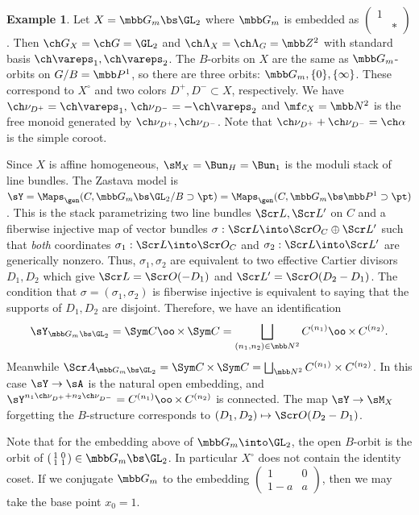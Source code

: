 \documentclass[final]{amsart}
\theoremstyle{remark}
\theoremstyle{definition}
\newtheorem{eg}[subsubsection]{Example}
\DeclareMathOperator*{\xt}{\times}
\numberwithin{equation}{section}
\begin{document}
\begin{eg} \label{eg:YHecke}
Let $X = \mbb G_m \bs \GL_2$ where $\mbb G_m$ is embedded as $\left( \begin{smallmatrix} 1 & \\ & * \end{smallmatrix} \right)$. 
Then $\ch G_X = \ch G = \GL_2$ and $\ch\Lambda_X = \ch\Lambda_G = \mbb Z^2$ with 
standard basis $\ch\vareps_1,\ch\vareps_2$.
The $B$-orbits on $X$ are the same as $\mbb G_m$-orbits on $G/B=\mbb P^1$, so
there are three orbits: $\mbb G_m, \{0\}, \{\infty\}$. 
These correspond to $X^\circ$ and two colors $D^+, D^- \subset X$, respectively.
We have $\ch\nu_{D^+} = \ch\vareps_1,\, \ch\nu_{D^-} = -\ch\vareps_2$
and $\mf c_X = \mbb N^2$ is the free monoid generated by $\ch\nu_{D^+}, \ch\nu_{D^-}$. 
Note that $\ch\nu_{D^+} + \ch\nu_{D^-} = \ch\alpha$ is the simple coroot. 

Since $X$ is affine homogeneous, $\sM_X = \Bun_H = \Bun_1$ is the moduli stack
of line bundles. The Zastava model is $\sY=\Maps_\gen(C, \mbb G_m \bs \GL_2/B \supset \pt) 
= \Maps_\gen(C, \mbb G_m \bs \mbb P^1 \supset \pt)$. 
This is the stack parametrizing two line bundles $\Scr L, \Scr L'$ on $C$
and a fiberwise injective map of vector bundles $\sigma :\Scr L \into \Scr O_C \oplus \Scr L'$ 
such that \emph{both} coordinates $\sigma_1 : \Scr L \into \Scr O_C$ and $\sigma_2 : \Scr L \into \Scr L'$ are generically nonzero. 
Thus, $\sigma_1,\sigma_2$ are equivalent to two effective Cartier divisors 
$D_1, D_2$ which give $\Scr L = \Scr O(-D_1)$ and $\Scr L' = \Scr O(D_2-D_1)$. 
The condition that $\sigma=(\sigma_1,\sigma_2)$ is fiberwise injective is equivalent
to saying that the supports of $D_1,D_2$ are disjoint. 
Therefore, we have an identification
\[ \sY_{\mbb G_m \bs \GL_2} = \Sym C \oo\xt \Sym C = \bigsqcup_{(n_1,n_2)\in \mbb N^2} C^{(n_1)} \oo\xt C^{(n_2)}. \]
Meanwhile $\Scr A_{\mbb G_m \bs \GL_2} = \Sym C \xt \Sym C = \bigsqcup_{\mbb N^2} C^{(n_1)} \times C^{(n_2)}$. 
In this case $\sY \to \sA$ is the natural open embedding, and 
$\sY^{n_1\ch\nu_{D^+}+n_2\ch\nu_{D^-}} = C^{(n_1)} \oo\xt C^{(n_2)}$ is connected.
The map $\sY \to \sM_X$ forgetting the $B$-structure corresponds to 
$(D_1,D_2) \mapsto \Scr O(D_2-D_1)$. 

Note that for the embedding above of $\mbb G_m \into \GL_2$, 
the open $B$-orbit is the orbit of $\left( \begin{smallmatrix} 1 & 0 \\ 1 & 1 \end{smallmatrix}
\right) \in \mbb G_m \bs \GL_2$. In particular $X^\circ$ does not contain the identity coset. 
If we conjugate $\mbb G_m$ to the embedding $\left( \begin{smallmatrix} 1 & 0 \\ 1-a & a \end{smallmatrix}\right)$, then we may take the base point $x_0=1$. 
\end{eg}
\end{document}
